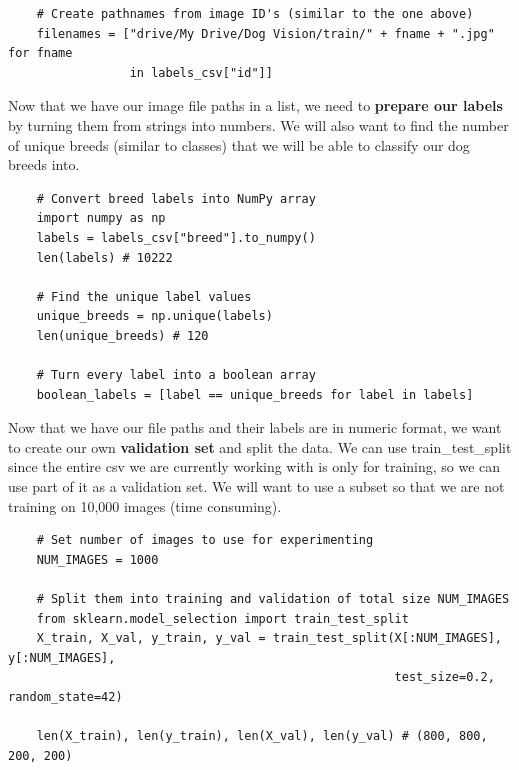 \documentclass[11pt, a4paper]{article}
\begin{document}
\begin{spacing}{1.1}
\begin{lstlisting}
	# Create pathnames from image ID's (similar to the one above)
	filenames = ["drive/My Drive/Dog Vision/train/" + fname + ".jpg" for fname 
	             in labels_csv["id"]] \end{lstlisting} \vspace*{1mm}
	Now that we have our image file paths in a list, we need to \textbf{prepare our labels} by turning them from strings into numbers. We will also want to find the number of unique breeds (similar to classes) that we will be able to classify our dog breeds into. 
	\begin{lstlisting}
	# Convert breed labels into NumPy array
	import numpy as np
	labels = labels_csv["breed"].to_numpy() 
	len(labels) # 10222
	
	# Find the unique label values
	unique_breeds = np.unique(labels)
	len(unique_breeds) # 120 
	
	# Turn every label into a boolean array
	boolean_labels = [label == unique_breeds for label in labels] \end{lstlisting} \vspace*{1mm}
	Now that we have our file paths and their labels are in numeric format, we want to create our own \textbf{validation set} and split the data. We can use train\_test\_split since the entire csv we are currently working with is only for training, so we can use part of it as a validation set. We will want to use a subset so that we are not training on 10,000 images (time consuming).
	\begin{lstlisting}
	# Set number of images to use for experimenting
	NUM_IMAGES = 1000
	
	# Split them into training and validation of total size NUM_IMAGES
	from sklearn.model_selection import train_test_split
	X_train, X_val, y_train, y_val = train_test_split(X[:NUM_IMAGES], y[:NUM_IMAGES],
	                                                  test_size=0.2, random_state=42)
	
	len(X_train), len(y_train), len(X_val), len(y_val) # (800, 800, 200, 200) \end{lstlisting} \newpage


\end{spacing}
\end{document}
